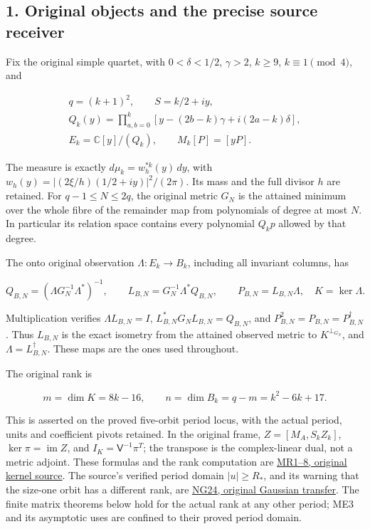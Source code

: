 \documentclass[11pt]{article}
\begin{document}
\subsection{1. Original objects and the precise source receiver}\label{original-objects-and-the-precise-source-receiver}

Fix the original simple quartet, with \(0<\delta<1/2\), \(\gamma>2\), \(k\ge9\), \(k\equiv1\pmod4\), and

\[
\begin{gathered}
q=(k+1)^2,\qquad S=k/2+iy,\\
Q_k(y)=\prod_{a,b=0}^k[y-(2b-k)\gamma+i(2a-k)\delta],\\
E_k=\mathbb C[y]/(Q_k),\qquad M_k[P]=[yP].
\end{gathered}
\tag{ME1}
\]

The measure is exactly \(d\mu_k=w_h^{*k}(y)\,dy\), with \(w_h(y)=|(2\xi/h)(1/2+iy)|^2/(2\pi)\). Its mass and the full divisor \(h\) are retained. For \(q-1\le N\le2q\), the original metric \(G_N\) is the attained minimum over the whole fibre of the remainder map from polynomials of degree at most \(N\). In particular its relation space contains every polynomial \(Q_kp\) allowed by that degree.

The onto original observation \(\Lambda:E_k\to B_k\), including all invariant columns, has

\[
Q_{B,N}=(\Lambda G_N^{-1}\Lambda^*)^{-1},\qquad
L_{B,N}=G_N^{-1}\Lambda^*Q_{B,N},\qquad
P_{B,N}=L_{B,N}\Lambda,
\quad K=\ker\Lambda.
\tag{ME2}
\]

Multiplication verifies \(\Lambda L_{B,N}=I\), \(L_{B,N}^*G_NL_{B,N}=Q_{B,N}\), and \(P_{B,N}^2=P_{B,N}=P_{B,N}^{\dagger}\). Thus \(L_{B,N}\) is the exact isometry from the attained observed metric to \(K^{\perp_{G_N}}\), and \(\Lambda=L_{B,N}^{\dagger}\). These maps are the ones used throughout.

The original rank is

\[
m=\dim K=8k-16,\qquad n=\dim B_k=q-m=k^2-6k+17.
\tag{ME3}
\]

This is asserted on the proved five-orbit period locus, with the actual period, units and coefficient pivots retained. In the original frame, \(Z=[M_A,S_kZ_k]\), \(\ker\pi=\operatorname{im}Z\), and \(I_K=\mathsf V^{-1}\pi^T\); the transpose is the complex-linear dual, not a metric adjoint. These formulas and the rank computation are \href{https://github.com/KokunoYumeto/zeta-function-research-reader/blob/5992ad50c0f2a06921f1fcaded7b4e38097c0739/workbenches/splitzero-tandem/continuations/20260920-original-kernel-mixed-determinants/ORIGINAL_KERNEL_MIXED_DETERMINANT.tex\#L30}{MR1--8, original kernel source}. The source's verified period domain \(|u|\ge R_*\), and its warning that the size-one orbit has a different rank, are \href{https://github.com/KokunoYumeto/zeta-function-research-reader/blob/5992ad50c0f2a06921f1fcaded7b4e38097c0739/workbenches/splitzero-tandem/continuations/20260920-original-kernel-mixed-determinants/providers/NATIVE_GAUSSIAN_TRANSFER.tex\#L482}{NG24, original Gaussian transfer}. The finite matrix theorems below hold for the actual rank at any other period; ME3 and its asymptotic uses are confined to their proved period domain.
\end{document}
